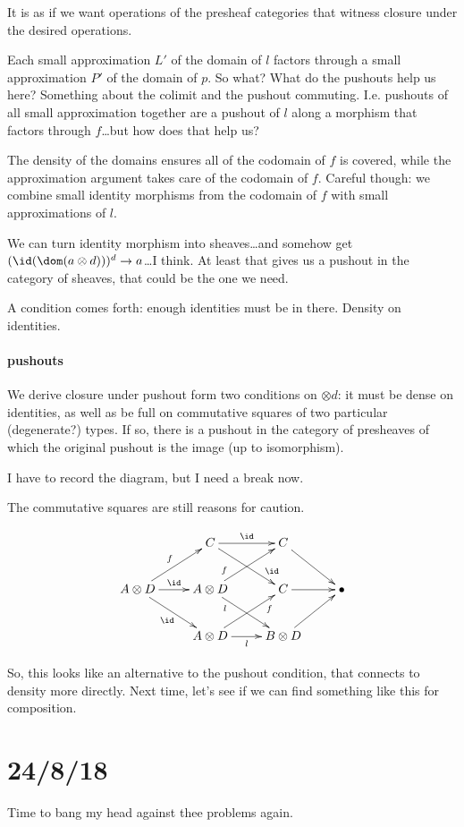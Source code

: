 \documentclass[csh.tex]{subfiles}
\begin{document}
It is as if we want operations of the presheaf categories that witness closure under the desired operations.

Each small approximation $L'$ of the domain of $l$ factors through a small approximation $P'$ of the domain of $p$. So what?
What do the pushouts help us here? Something about the colimit and the pushout commuting. I.e. pushouts of all small approximation together are a pushout of $l$ along a morphism that factors through $f$\dots but how does that help us?

The density of the domains ensures all of the codomain of $f$ is covered, while the approximation argument takes care of the codomain of $f$. Careful though: we combine small identity morphisms from the codomain of $f$ with small approximations of $l$.

We can turn identity morphism into sheaves\dots and somehow get $(\id(\dom(a\otimes d)))^d\to a$\dots I think. At least that gives us a pushout in the category of sheaves, that could be the one we need.

A condition comes forth: enough identities must be in there. Density on identities. 

\paragraph{pushouts}
We derive closure under pushout form two conditions on $\otimes d$: it must be dense on identities, as well as be full on commutative squares of two particular (degenerate?) types. If so, there is a pushout in the category of presheaves of which the original pushout is the image (up to isomorphism). 

I have to record the diagram, but I need a break now.

The commutative squares are still reasons for caution.

\[\xymatrix{
& C \ar[r]^\id \ar[dr]^(.75)\id & C \ar[dr]\\
A\otimes D \ar[ur]^f\ar[dr]_\id\ar[r]^\id & A\otimes D\ar[ur]^(.25)f\ar[dr]_(.25)l & C\ar[r] & \bullet \\
& A\otimes D \ar[r]_l\ar[ur]_(.75)f & B\otimes D\ar[ur]
}\]

So, this looks like an alternative to the pushout condition, that connects to density more directly. 
Next time, let's see if we can find something like this for composition.


\section{24/8/18}
Time to bang my head against thee problems again.
\end{document}

